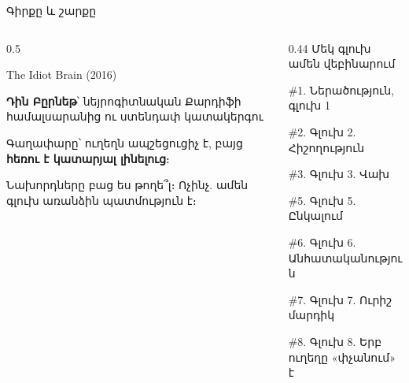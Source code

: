 \begin{frame}{Գիրքը և շարքը}
  \begin{columns}[T]
    \begin{column}{0.5\textwidth}
      \begin{card}
        {\blackfont\Large The Idiot Brain} {\small (2016)}\par\smallskip
        \textbf{Դին Բըրնեթ}՝ նեյրոգիտնական Քարդիֆի համալսարանից ու ստենդափ կատակերգու \par\smallskip
        Գաղափարը՝ ուղեղն ապշեցուցիչ է, բայց \textbf{հեռու է կատարյալ լինելուց}։
      \end{card}
      \vspace{1mm}
      \begin{card}[colback=mint!35!cardwhite]
        Նախորդները բաց ես թողե՞լ։ Ոչինչ. ամեն գլուխ առանձին պատմություն է։
      \end{card}
    \end{column}
    \begin{column}{0.44\textwidth}
      {\blackfont\small Մեկ գլուխ ամեն վեբինարում}\par\medskip
      {\color{plum!55!cream}\small \#1. Ներածություն, գլուխ 1\par\smallskip
      \#2. Գլուխ 2. Հիշողություն\par\smallskip
      \#3. Գլուխ 3. Վախ}\par\smallskip
      \par\smallskip
      {\color{plum!55!cream}\small \#5. Գլուխ 5. Ընկալում\par\smallskip
      \#6. Գլուխ 6. Անհատականություն\par\smallskip
      \#7. Գլուխ 7. Ուրիշ մարդիկ\par\smallskip
      \#8. Գլուխ 8. Երբ ուղեղը «փչանում» է}
    \end{column}
  \end{columns}
\end{frame}

